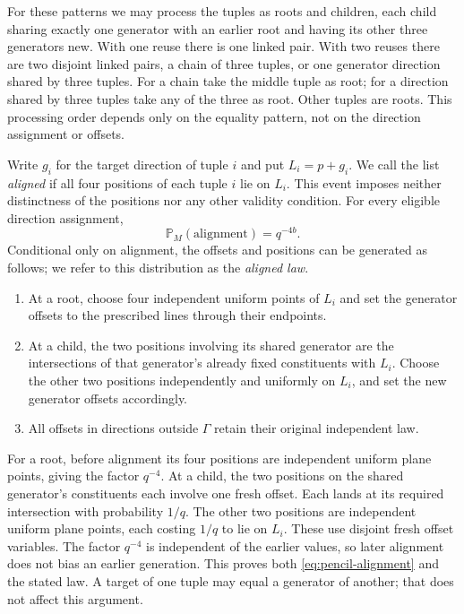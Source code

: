 For these patterns we may process the tuples as roots and children, each
child sharing exactly one generator with an earlier root and having its
other three generators new.  With one reuse there is one linked pair.
With two reuses there are two disjoint linked pairs, a chain of three
tuples, or one generator direction shared by three tuples.  For a chain
take the middle tuple as root; for a direction shared by three tuples
take any of the three as root.  Other tuples are roots.  This processing
order depends only on the equality
pattern, not on the direction assignment or offsets.

Write $g_i$ for the target direction of tuple $i$ and put $L_i=p+g_i$.
We call the list \emph{aligned} if all four positions of each tuple $i$
lie on $L_i$.  This event imposes neither distinctness of the positions
nor any other validity condition.  For every eligible direction
assignment,
\begin{equation}\label{eq:pencil-alignment}
 \mathbb P_M(\text{alignment})=q^{-4b}.
\end{equation}
Conditional only on alignment, the offsets and positions can be generated
as follows; we refer to this distribution as the \emph{aligned law}.
\begin{enumerate}[label=(\roman*)]
\item At a root, choose four independent uniform points of $L_i$ and set
the generator offsets to the prescribed lines through their endpoints.
\item At a child, the two positions involving its shared generator are
the intersections of that generator's already fixed constituents with
$L_i$.  Choose the other two positions independently and uniformly on
$L_i$, and set the new generator offsets accordingly.
\item All offsets in directions outside $\Gamma$ retain their original
independent law.
\end{enumerate}
For a root, before alignment its four positions are independent uniform
plane points, giving the factor $q^{-4}$.  At a child, the two positions
on the shared generator's constituents each involve one fresh offset.
Each lands at its required intersection with probability $1/q$.  The
other two positions are independent uniform plane points, each costing
$1/q$ to lie on $L_i$.  These use disjoint fresh offset variables.  The
factor $q^{-4}$ is independent of the earlier values, so later alignment
does not bias an earlier generation.  This proves both
\eqref{eq:pencil-alignment} and the stated law.  A target of one tuple may
equal a generator of another; that does not affect this argument.

